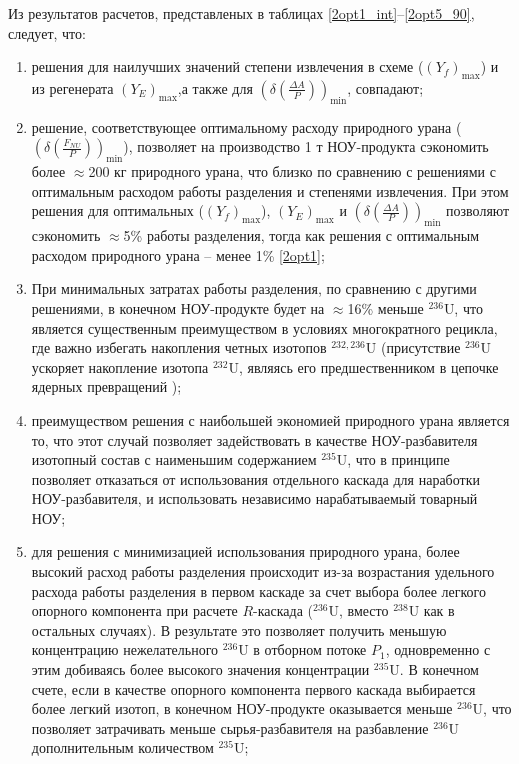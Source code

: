 Из результатов расчетов, представленых в таблицах \ref{2opt1_int}--\ref{2opt5_90}, следует, что:
\begin{enumerate}
    \item решения для наилучших значений степени извлечения в схеме ($(Y_{f})_\text{max}$) и из регенерата $(Y_{E})_\text{max}$,а также для $(\delta(\frac{\Delta A}{P}))_\text{min}$, совпадают;
    \item решение, соответствующее оптимальному расходу природного урана ($(\delta(\frac{F_{NU}}{P}))_\text{min}$), позволяет на производство 1 т НОУ-продукта сэкономить более $\approx$200 кг природного урана, что близко по сравнению с решениями с оптимальным расходом работы разделения и степенями извлечения. При этом решения для оптимальных ($(Y_{f})_\text{max}$), $(Y_{E})_\text{max}$ и $(\delta(\frac{\Delta A}{P}))_\text{min}$ позволяют сэкономить $\approx$5\% работы разделения, тогда как решения с оптимальным расходом природного урана -- менее 1\% \ref{2opt1};
    \item При минимальных затратах работы разделения, по сравнению с другими решениями, в конечном НОУ-продукте будет на $\approx$16\% меньше $^{236}$U, что является существенным преимуществом в условиях многократного рецикла, где важно избегать накопления четных изотопов $^{232,236}$U (присутствие $^{236}$U ускоряет накопление изотопа $^{232}$U, являясь его предшественником в цепочке ядерных превращений \cite{smirnovEvolutionIsotopicComposition2012});
    \item преимуществом решения с наибольшей экономией природного урана является то, что этот случай позволяет задействовать в качестве НОУ-разбавителя изотопный состав с наименьшим содержанием $^{235}$U, что в принципе позволяет отказаться от использования отдельного каскада для наработки НОУ-разбавителя, и использовать независимо нарабатываемый товарный НОУ;
    \item для решения с минимизацией использования природного урана, более высокий расход работы разделения происходит из-за возрастания удельного расхода работы разделения в первом каскаде за счет выбора более легкого опорного компонента при расчете $R$-каскада ($^{236}$U, вместо $^{238}$U как в остальных случаях). В результате это позволяет получить меньшую концентрацию нежелательного $^{236}$U в отборном потоке $P_{1}$, одновременно с этим добиваясь более высокого значения концентрации $^{235}$U. В конечном счете, если в качестве опорного компонента первого каскада выбирается более легкий изотоп, в конечном НОУ-продукте оказывается меньше $^{236}$U, что позволяет затрачивать меньше сырья-разбавителя на разбавление $^{236}$U дополнительным количеством $^{235}$U;

\end{enumerate}
